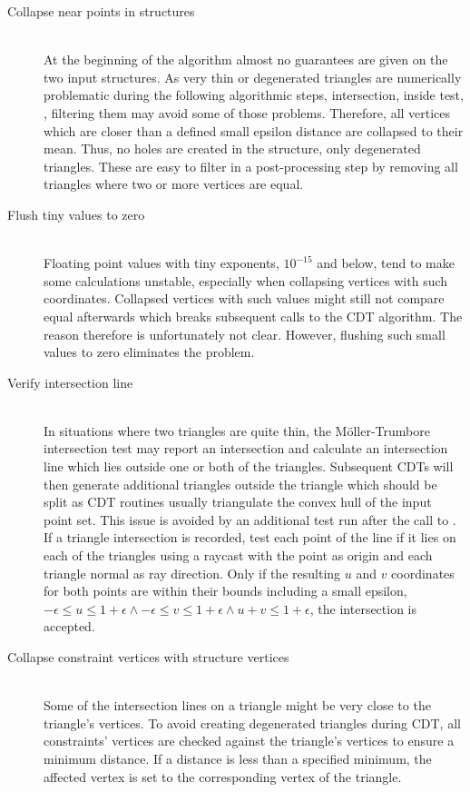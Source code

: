 \begin{description}
	
	\item[Collapse near points in structures] \hfill \\
	At the beginning of the  algorithm almost no guarantees are given on the two input structures.
	As very thin or degenerated triangles are numerically problematic during the following algorithmic steps, \eg intersection, inside test, \etc, filtering them may avoid some of those problems.
	Therefore, all vertices which are closer than a defined small epsilon distance are collapsed to their mean.
	Thus, no holes are created in the structure, only degenerated triangles.
	These are easy to filter in a post-processing step by removing all triangles where two or more vertices are equal.
	

	\item[Flush tiny values to zero] \hfill \\
	Floating point values with tiny exponents, \eg $10^{-15}$ and below, tend to make some calculations unstable, especially when collapsing vertices with such coordinates.
	Collapsed vertices with such values might still not compare equal afterwards which breaks subsequent calls to the CDT algorithm.
	The reason therefore is unfortunately not clear.
	However, flushing such small values to zero eliminates the problem.
	
	
	\item[Verify intersection line] \hfill \\
	In situations where two triangles are quite thin, the Möller-Trumbore intersection test may report an intersection and calculate an intersection line which lies outside one or both of the triangles.
	Subsequent CDTs will then generate additional triangles outside the triangle which should be split as CDT routines usually triangulate the convex hull of the input point set.
	This issue is avoided by an additional test run after the call to .
	If a triangle intersection is recorded, test each point of the line if it lies on each of the triangles using a raycast with the point as origin and each triangle normal as ray direction.
	Only if the resulting $u$ and $v$ coordinates for both points are within their bounds including a small epsilon, \ie $-\epsilon \leq u \leq 1+\epsilon \wedge -\epsilon \leq v \leq 1+\epsilon \wedge u + v \leq 1 + \epsilon$, the intersection is accepted.
	
	
	\item[Collapse constraint vertices with structure vertices] \hfill \\
	Some of the intersection lines on a triangle might be very close to the triangle's vertices.
	To avoid creating degenerated triangles during CDT, all constraints' vertices are checked against the triangle's vertices to ensure a minimum distance.
	If a distance is less than a specified minimum, the affected vertex is set to the corresponding vertex of the triangle.
	

\end{description}
